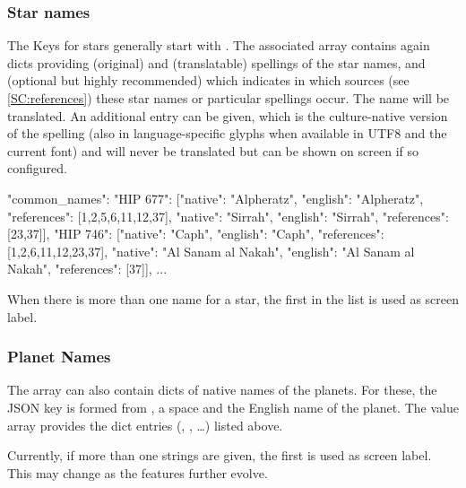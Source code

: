 \subsubsection{Star names}


The Keys for stars generally start with . 
The associated array contains again dicts providing  (original) and 
 (translatable) spellings of the star names, 
and  (optional but highly recommended) which indicates 
in which sources (see \ref{SC:references}) these star names or particular spellings occur.
The  name will be translated. An additional  entry can be given, 
which is the culture-native version of the spelling 
(also in language-specific glyphs when available in UTF8 and the current font) and will never be translated but can be shown on screen if so configured.


\begin{jsonfile}[\tiny]
"common_names": {
    "HIP 677": [{"native": "Alpheratz",         "english": "Alpheratz",         "references": [1,2,5,6,11,12,37]},
                {"native": "Sirrah",            "english": "Sirrah",            "references": [23,37]}],
    "HIP 746": [{"native": "Caph",              "english": "Caph",              "references": [1,2,6,11,12,23,37]},
                {"native": "Al Sanam al Nakah", "english": "Al Sanam al Nakah", "references": [37]}],
	... }
\end{jsonfile}

When there is more than one name for a star, the first in the list is used as screen label. 


\subsubsection{Planet Names}
\label{sec:skycultures:planetnames}

The   array can also contain dicts of native names of the planets. 
For these, the JSON key is formed from , a space and the English name of the planet. 
The value array provides the dict entries (, , \ldots) listed above. 

Currently, if more than one  strings are given, the first is used as screen label. This may change as the features further evolve.

